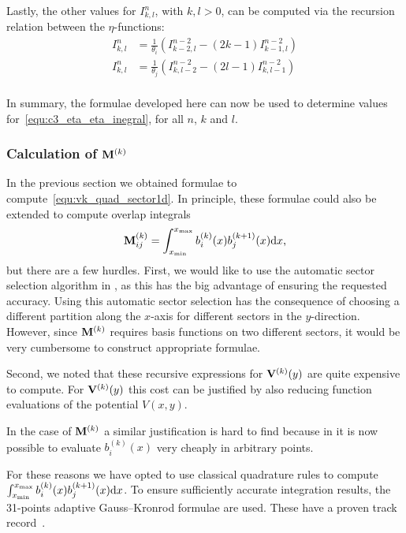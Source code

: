 Lastly, the other values for $I_{k,l}^n$, with $k, l > 0$, can be computed via the recursion relation between the $\eta$-functions:
\begin{align*}
  I_{k, l}^n & = \frac{1}{\theta_i} \left(I_{k-2,l}^{n-2} - (2k - 1) I_{k-1,l}^{n-2}\right) \\
  I_{k, l}^n & = \frac{1}{\theta_j} \left(I_{k,l-2}^{n-2} - (2l - 1) I_{k,l-1}^{n-2}\right) \\
\end{align*}

In summary, the formulae developed here can now be used to determine values for~\eqref{equ:c3_eta_eta_inegral}, for all $n$, $k$ and $l$.

\subsubsection{Calculation of \texorpdfstring{$\vb{M}^{(k)}$}{M(k)}}

In the previous section we obtained formulae to compute~\eqref{equ:vk_quad_sector1d}. In principle, these formulae could also be extended to compute overlap integrals
$$
  \vb{M}_{ij}^{(k)} = \int_{{x_{\text{min}}}}^{{x_{\text{max}}}}b_i^{(k)}(x)b_j^{(k+1)}(x)\dd x\text{,}
$$
but there are a few hurdles. First, we would like to use the automatic sector selection algorithm in \matslise{}, as this has the big advantage of ensuring the requested accuracy. Using this automatic sector selection has the consequence of choosing a different partition along the $x$-axis for different sectors in the $y$-direction. However, since $\vb{M}^{(k)}$ requires basis functions on two different sectors, it would be very cumbersome to construct appropriate formulae.

Second, we noted that these recursive expressions for $\vb{V}^{(k)}(y)$ are quite expensive to compute. For $\vb{V}^{(k)}(y)$ this cost can be justified by also reducing function evaluations of the potential $V(x, y)$.

In the case of $\vb{M}^{(k)}$ a similar justification is hard to find because in  it is now possible to evaluate $b^{(k)}_i(x)$ very cheaply in arbitrary points.

For these reasons we have opted to use classical quadrature rules to compute $\int_{{x_{\text{min}}}}^{{x_{\text{max}}}}b_i^{(k)}(x)b_j^{(k+1)}(x)\dd x$. To ensure sufficiently accurate integration results, the 31-points adaptive Gauss--Kronrod formulae are used. These have a proven track record~\cite{piessens_quadpack_1983}.



